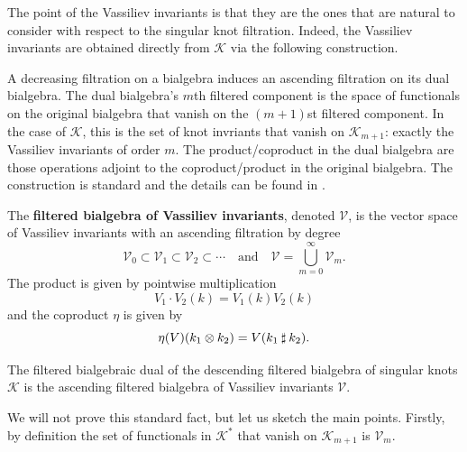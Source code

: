 The point of the Vassiliev invariants is that they are the ones that are natural to consider with respect to the singular knot filtration. Indeed, the Vassiliev invariants are obtained directly from \(\mathcal{K}\) via the following construction.

A decreasing filtration on a bialgebra induces an ascending filtration on its dual bialgebra. The dual bialgebra's \(m\)th filtered component is the space of functionals on the original bialgebra that vanish on the \((m + 1)\)st filtered component. In the case of \(\mathcal{K}\), this is the set of knot invriants that vanish on \(\mathcal{K}_{m + 1}\): exactly the Vassiliev invariants of order \(m\). The product/coproduct in the dual bialgebra are those operations adjoint to the coproduct/product in the original bialgebra. The construction is standard and the details can be found in \cite[Appendix A.2.4]{introduction-to-vassiliev-invariants}.

\begin{definition}
	The \textbf{filtered bialgebra of Vassiliev invariants}, denoted \(\mathcal{V}\), is the vector space of Vassiliev invariants with an ascending filtration by degree
	\[\mathcal{V}_{0} \subset \mathcal{V}_{1} \subset \mathcal{V}_{2} \subset \cdots \quad \text{and} \quad \mathcal{V} = \bigcup_{m = 0}^{\infty} \mathcal{V}_{m}.\]
	The product is given by pointwise multiplication
	\[V_{1} \cdot V_{2}(k) = V_{1}(k)V_{2}(k)\]
	and the coproduct \(\eta\) is given by
	\[\eta(V)(k_{1} \otimes k_{2}) = V(k_{1} \mathbin{\sharp} k_{2}).\]
\end{definition}

\begin{proposition}
	\label{prop:vassiliev-invariants-dual-to-singular-knots}
	The filtered bialgebraic dual of the descending filtered bialgebra of singular knots \(\mathcal{K}\) is the ascending filtered bialgebra of Vassiliev invariants \(\mathcal{V}\).
\end{proposition}

We will not prove this standard fact, but let us sketch the main points. Firstly, by definition the set of functionals in \(\mathcal{K}^{\ast}\) that vanish on \(\mathcal{K}_{m + 1}\) is \(\mathcal{V}_{m}\).

